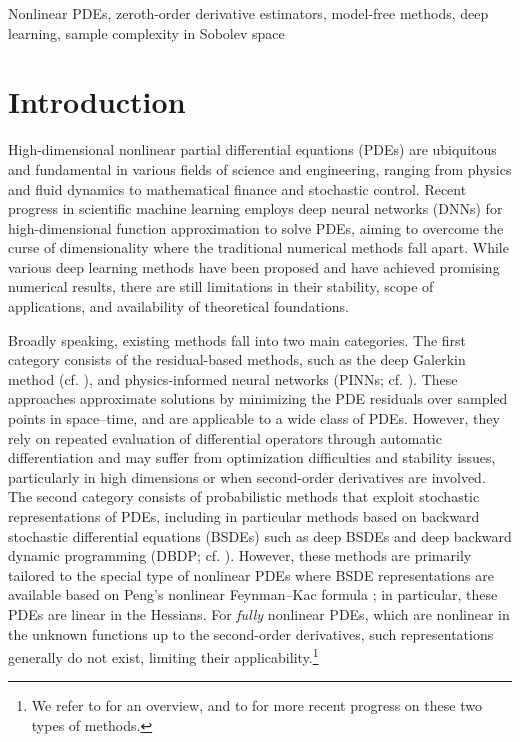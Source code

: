 \documentclass[twoside,11pt]{article}
\newcommand{\1}{\mathbf{1}}
\numberwithin{equation}{section}
\begin{document}
\begin{keywords}
Nonlinear PDEs, zeroth-order derivative estimators, model-free methods, deep learning,  sample complexity in Sobolev space
\end{keywords}

\section{Introduction}
High-dimensional nonlinear partial differential equations (PDEs) are ubiquitous and fundamental in various fields of science and engineering, ranging from physics and fluid dynamics to mathematical finance and stochastic control. Recent progress in scientific machine learning employs  deep neural networks (DNNs) for high-dimensional function approximation to solve PDEs, aiming to overcome the curse of dimensionality where the traditional numerical methods fall apart. While various deep learning methods have been proposed and have achieved promising numerical results, there are still limitations in their stability, scope of applications, and availability of theoretical foundations.

Broadly speaking, existing methods fall into two main categories. The first category consists of the residual-based methods, such as the deep Galerkin method (cf. \citealt{siri18}),  and physics-informed neural networks (PINNs; cf. \citealt{raissi19}). These approaches approximate solutions by minimizing the PDE residuals over sampled points in space--time, and are applicable to a wide class of PDEs. However, they rely on repeated evaluation of differential operators through automatic differentiation and may suffer from optimization difficulties and stability issues, particularly in high dimensions or when second-order derivatives are involved.
The second category consists of probabilistic methods that exploit stochastic representations of PDEs, including in particular methods based on backward stochastic differential equations (BSDEs) such as deep BSDEs \citep{han17} and deep backward dynamic programming (DBDP; cf. \citealt{hure20}). However, these methods are primarily tailored to the special type of nonlinear PDEs where BSDE representations are available based on Peng's nonlinear Feynman--Kac formula \citep{peng1992nonlinear}; in particular, these PDEs are linear in the Hessians.  For {\it fully} nonlinear PDEs, which are nonlinear in the unknown functions up to the second-order derivatives,  such representations generally do not exist, limiting their applicability.\footnote{We refer to \citet{bec23,germain23} for an overview, and to \citet{zhangetal26,doumeche2025convergence,gazoulis2025stability,bonito2026convergence,wang20222} for more recent progress on these two types of methods.}
\end{document}
